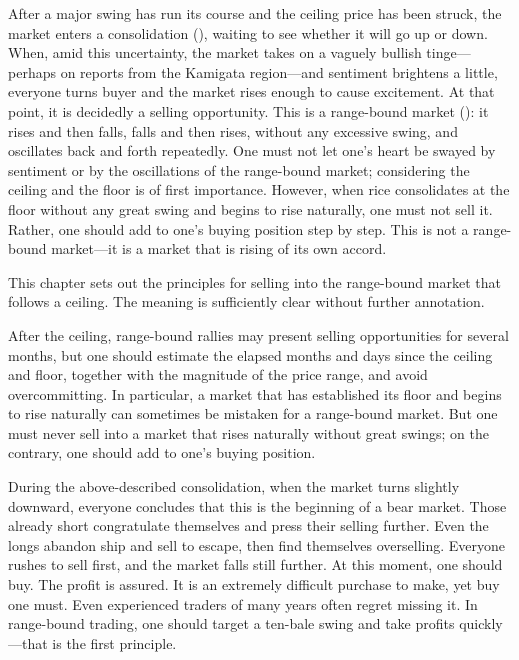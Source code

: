 \begin{sokyubox}
{\small\itshape\color{sokyubar} }

\medskip
After a major swing has run its course and the ceiling price has
been struck, the market enters a consolidation (),
waiting to see whether it will go up or down. When, amid this
uncertainty, the market takes on a vaguely bullish tinge---perhaps
on reports from the Kamigata region---and sentiment brightens a
little, everyone turns buyer and the market rises enough to cause
excitement. At that point, it is decidedly a selling opportunity.
This is a range-bound market (): it rises and
then falls, falls and then rises, without any excessive swing, and
oscillates back and forth repeatedly. One must not let one's heart
be swayed by sentiment or by the oscillations of the range-bound
market; considering the ceiling and the floor is of first
importance. However, when rice consolidates at the floor without
any great swing and begins to rise naturally, one must not sell it.
Rather, one should add to one's buying position step by step. This
is not a range-bound market---it is a market that is rising of its
own accord.
\end{sokyubox}

\commentary
This chapter sets out the principles for selling into the
range-bound market that follows a ceiling. The meaning is
sufficiently clear without further annotation.

After the ceiling, range-bound rallies may present selling
opportunities for several months, but one should estimate the
elapsed months and days since the ceiling and floor, together with
the magnitude of the price range, and avoid overcommitting. In
particular, a market that has established its floor and begins to
rise naturally can sometimes be mistaken for a range-bound market.
But one must never sell into a market that rises naturally without
great swings; on the contrary, one should add to one's buying
position.


\begin{sokyubox}
{\small\itshape\color{sokyubar} }

\medskip
During the above-described consolidation, when the market turns
slightly downward, everyone concludes that this is the beginning
of a bear market. Those already short congratulate themselves and
press their selling further. Even the longs abandon ship and sell
to escape, then find themselves overselling. Everyone rushes to sell
first, and the market falls still further. At this moment, one
should buy. The profit is assured. It is an extremely difficult
purchase to make, yet buy one must. Even experienced traders of
many years often regret missing it. In range-bound trading, one
should target a ten-bale swing and take profits quickly---that is
the first principle.
\end{sokyubox}

